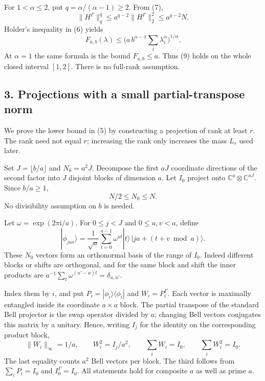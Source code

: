 \documentclass[11pt]{article}
\begin{document}
For \(1<\alpha\le2\), put \(q=\alpha/(\alpha-1)\ge2\). From (7), \[
 \|H^\Gamma\|_q^q\le a^{q-2}\|H^\Gamma\|_2^2\le a^{q-2}N.
\] Holder's inequality in (6) yields \[
 F_{a,b}(\lambda)\le
 \biggl(a\,b^{\alpha-1}\sum_i\lambda_i^\alpha\biggr)^{1/\alpha}.
 \tag{9}
\] At \(\alpha=1\) the same formula is the bound \(F_{a,b}\le a\). Thus (9) holds on the whole closed interval \([1,2]\). There is no full-rank assumption.

\hypertarget{projections-with-a-small-partial-transpose-norm}{%
\subsection{3. Projections with a small partial-transpose norm}\label{projections-with-a-small-partial-transpose-norm}}

We prove the lower bound in (5) by constructing a projection of rank at least \(r\). The rank need not equal \(r\); increasing the rank only increases the mass \(L_r\) used later.

Set \(J=\lfloor b/a\rfloor\) and \(N_0=a^2J\). Decompose the first \(aJ\) coordinate directions of the second factor into \(J\) disjoint blocks of dimension \(a\). Let \(I_0\) project onto \(\mathbb C^a\otimes\mathbb C^{aJ}\). Since \(b/a\ge1\), \[
 N/2\le N_0\le N.
 \tag{10}
\] No divisibility assumption on \(b\) is needed.

Let \(\omega=\exp(2\pi\mathrm i/a)\). For \(0\le j<J\) and \(0\le u,v<a\), define \[
 |\phi_{juv}\rangle
 =\frac1{\sqrt a}\sum_{t=0}^{a-1}\omega^{ut}
 |t\rangle\,|ja+(t+v\bmod a)\rangle.
 \tag{11}
\] These \(N_0\) vectors form an orthonormal basis of the range of \(I_0\). Indeed different blocks or shifts are orthogonal, and for the same block and shift the inner products are \(a^{-1}\sum_t\omega^{(u'-u)t}=\delta_{u,u'}\).

Index them by \(i\), and put \(P_i=|\phi_i\rangle\langle\phi_i|\) and \(W_i=P_i^\Gamma\). Each vector is maximally entangled inside its coordinate \(a\times a\) block. The partial transpose of the standard Bell projector is the swap operator divided by \(a\); changing Bell vectors conjugates this matrix by a unitary. Hence, writing \(I_j\) for the identity on the corresponding product block, \[
 \|W_i\|_\infty=1/a,\qquad W_i^2=I_j/a^2,
 \qquad \sum_iW_i=I_0,\qquad\sum_iW_i^2=I_0.
 \tag{12}
\] The last equality counts \(a^2\) Bell vectors per block. The third follows from \(\sum_iP_i=I_0\) and \(I_0^\Gamma=I_0\). All statements hold for composite \(a\) as well as prime \(a\).
\end{document}
